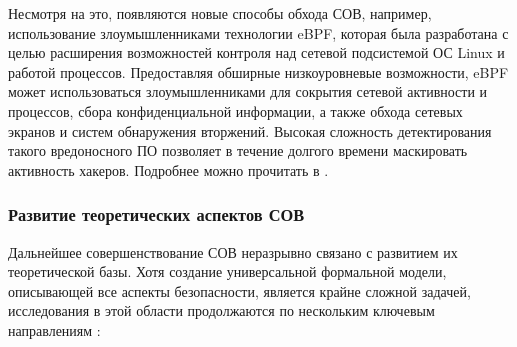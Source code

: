 Несмотря на это, появляются новые способы обхода СОВ, например, использование злоумышленниками технологии eBPF, которая была разработана с целью расширения возможностей контроля над сетевой подсистемой ОС Linux и работой процессов.
Предоставляя обширные низкоуровневые возможности, eBPF может использоваться злоумышленниками для сокрытия сетевой активности и процессов, сбора конфиденциальной информации, а также обхода сетевых экранов и систем обнаружения вторжений.
Высокая сложность детектирования такого вредоносного ПО позволяет в течение долгого времени маскировать активность хакеров.
Подробнее можно прочитать в \autocite{eBPFhabr}.

\subsubsection{Развитие теоретических аспектов СОВ}

Дальнейшее совершенствование СОВ неразрывно связано с развитием их теоретической базы. Хотя создание универсальной формальной модели, описывающей все аспекты безопасности, является крайне сложной задачей, исследования в этой области продолжаются по нескольким ключевым направлениям \autocite{IDSBranitsky}:

